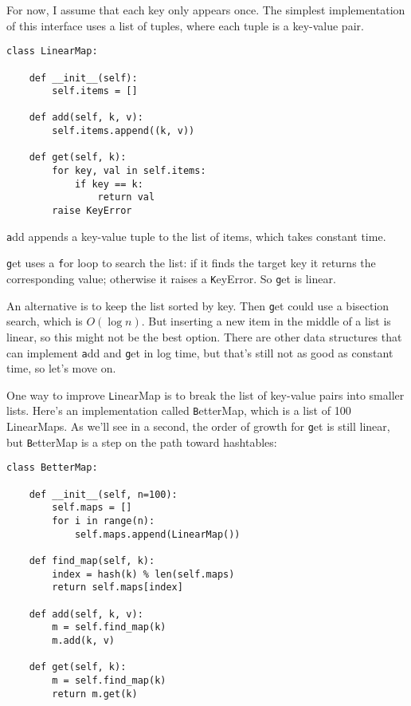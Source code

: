 \documentclass[
DIV=11,
fontsize=12,
twoside,
headinclude=false,
titlepage=firstiscover,
abstract=true,
headsepline=true,
footsepline=true,
chapterprefix=true, %
headings=big,
bibliography=totoc,%
captions=tableheading
]{scrbook}
\theoremstyle{definition}
\begin{document}
For now, I assume that each key only appears once.
The simplest implementation of this interface uses a list of
tuples, where each tuple is a key-value pair.

\begin{lstlisting}
class LinearMap:

    def __init__(self):
        self.items = []

    def add(self, k, v):
        self.items.append((k, v))

    def get(self, k):
        for key, val in self.items:
            if key == k:
                return val
        raise KeyError
\end{lstlisting}

{\texttt add} appends a key-value tuple to the list of items, which
takes constant time.

{\texttt get} uses a {\texttt for} loop to search the list:
if it finds the target key it returns the corresponding value;
otherwise it raises a {\texttt KeyError}.
So {\texttt get} is linear.

An alternative is to keep the list sorted by key.  Then {\texttt get}
could use a bisection search, which is $O(\log n)$.  But inserting a
new item in the middle of a list is linear, so this might not be the
best option.  There are other data structures that can implement {\texttt
  add} and {\texttt get} in log time, but that's still not as good as
constant time, so let's move on.

One way to improve {\texttt LinearMap} is to break the list of key-value
pairs into smaller lists.  Here's an implementation called
{\texttt BetterMap}, which is a list of 100 LinearMaps.  As we'll see
in a second, the order of growth for {\texttt get} is still linear,
but {\texttt BetterMap} is a step on the path toward hashtables:

\begin{lstlisting}
class BetterMap:

    def __init__(self, n=100):
        self.maps = []
        for i in range(n):
            self.maps.append(LinearMap())

    def find_map(self, k):
        index = hash(k) % len(self.maps)
        return self.maps[index]

    def add(self, k, v):
        m = self.find_map(k)
        m.add(k, v)

    def get(self, k):
        m = self.find_map(k)
        return m.get(k)
\end{lstlisting}
\end{document}
